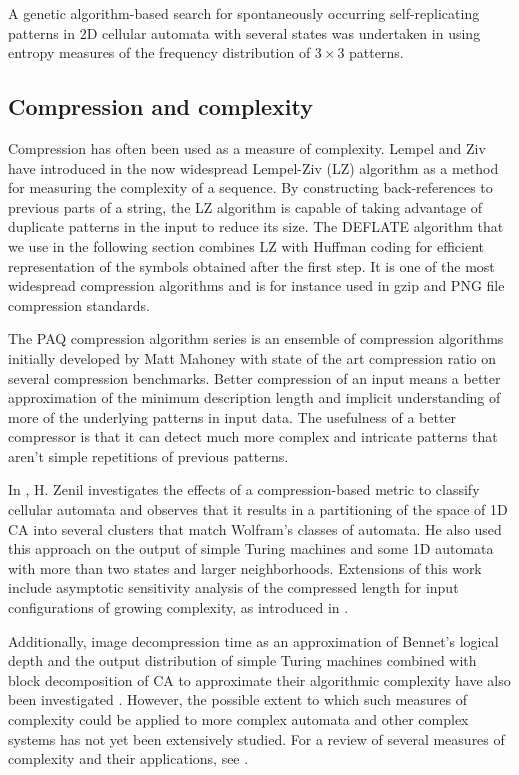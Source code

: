 A genetic algorithm-based search for spontaneously occurring self-replicating
patterns in 2D cellular automata with several states was undertaken in
\parencite{bilotta_artificial_2011} using entropy measures of the frequency
distribution of $3\times 3$ patterns.

\subsection{Compression and complexity}
Compression has often been used as a measure of complexity. Lempel and Ziv have
introduced in \parencite{lempel_complexity_1976} the now widespread Lempel-Ziv (LZ)
algorithm as a method for measuring the complexity of a sequence. By
constructing back-references to previous parts of a string, the LZ algorithm is
capable of taking advantage of duplicate patterns in the input to reduce its
size. The DEFLATE algorithm that we use in the following section combines LZ
with Huffman coding for efficient representation of the symbols obtained after
the first step. It is one of the most widespread compression algorithms and is
for instance used in gzip and PNG file compression standards.

The PAQ compression algorithm series \parencite{mahoney_fast_2000} is an ensemble of
compression algorithms initially developed by Matt Mahoney with state of the art
compression ratio on several compression benchmarks. Better compression of an
input means a better approximation of the minimum description length and
implicit understanding of more of the underlying patterns in input data. The
usefulness of a better compressor is that it can detect much more complex and
intricate patterns that aren't simple repetitions of previous patterns.

In \parencite{zenil_compression-based_2010}, H. Zenil investigates the effects of a
compression-based metric to classify cellular automata and observes that it
results in a partitioning of the space of 1D CA into several clusters that match
Wolfram's classes of automata. He also used this approach on the output of
simple Turing machines and some 1D automata with more than two states and larger
neighborhoods. Extensions of this work include asymptotic sensitivity analysis
of the compressed length for input configurations of growing complexity, as
introduced in \parencite{zenil_asymptotic_2013, zenil_what_2014}.

Additionally, image decompression time as an approximation of Bennet's logical
depth \parencite{bennett_logical_1995, zenil_image_2012} and the output distribution
of simple Turing machines combined with block decomposition of CA to approximate
their algorithmic complexity have also been investigated
\parencite{zenil_two-dimensional_2015, soler-toscano_calculating_2014}. However, the
possible extent to which such measures of complexity could be applied to more
complex automata and other complex systems has not yet been extensively studied.
For a review of several measures of complexity and their applications, see
\parencite{grassberger_randomness_1989}.

